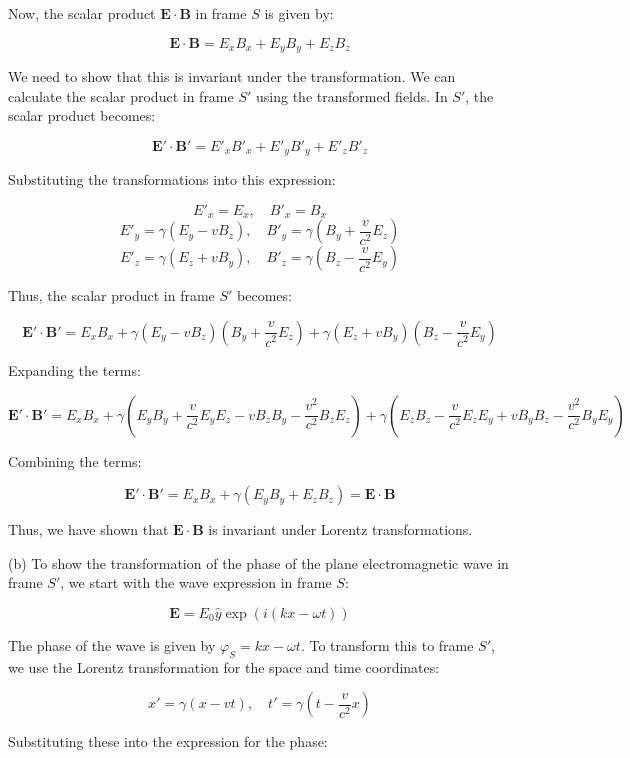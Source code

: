 Now, the scalar product \( \mathbf{E} \cdot \mathbf{B} \) in frame \( S \) is given by:

\[
\mathbf{E} \cdot \mathbf{B} = E_x B_x + E_y B_y + E_z B_z
\]

We need to show that this is invariant under the transformation. We can calculate the scalar product in frame \( S' \) using the transformed fields. In \( S' \), the scalar product becomes:

\[
\mathbf{E'} \cdot \mathbf{B'} = E'_x B'_x + E'_y B'_y + E'_z B'_z
\]

Substituting the transformations into this expression:

\[
E'_x = E_x, \quad B'_x = B_x
\]
\[
E'_y = \gamma (E_y - v B_z), \quad B'_y = \gamma \left( B_y + \frac{v}{c^2} E_z \right)
\]
\[
E'_z = \gamma (E_z + v B_y), \quad B'_z = \gamma \left( B_z - \frac{v}{c^2} E_y \right)
\]

Thus, the scalar product in frame \( S' \) becomes:

\[
\mathbf{E'} \cdot \mathbf{B'} = E_x B_x + \gamma (E_y - v B_z) \left( B_y + \frac{v}{c^2} E_z \right) + \gamma (E_z + v B_y) \left( B_z - \frac{v}{c^2} E_y \right)
\]

Expanding the terms:

\[
\mathbf{E'} \cdot \mathbf{B'} = E_x B_x + \gamma \left( E_y B_y + \frac{v}{c^2} E_y E_z - v B_z B_y - \frac{v^2}{c^2} B_z E_z \right)
+ \gamma \left( E_z B_z - \frac{v}{c^2} E_z E_y + v B_y B_z - \frac{v^2}{c^2} B_y E_y \right)
\]

Combining the terms:

\[
\mathbf{E'} \cdot \mathbf{B'} = E_x B_x + \gamma \left( E_y B_y + E_z B_z \right)
= \mathbf{E} \cdot \mathbf{B}
\]

Thus, we have shown that \( \mathbf{E} \cdot \mathbf{B} \) is invariant under Lorentz transformations.

(b) To show the transformation of the phase of the plane electromagnetic wave in frame \( S' \), we start with the wave expression in frame \( S \):

\[
\mathbf{E} = E_0 \hat{y} \exp \left( i(kx - \omega t) \right)
\]

The phase of the wave is given by \( \varphi_S = kx - \omega t \). To transform this to frame \( S' \), we use the Lorentz transformation for the space and time coordinates:

\[
x' = \gamma (x - vt), \quad t' = \gamma \left( t - \frac{v}{c^2} x \right)
\]

Substituting these into the expression for the phase:

